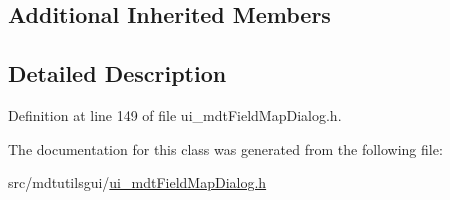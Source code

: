 \subsection*{Additional Inherited Members}


\subsection{Detailed Description}


Definition at line 149 of file ui\-\_\-mdt\-Field\-Map\-Dialog.\-h.



The documentation for this class was generated from the following file\-:\begin{DoxyCompactItemize}
\item 
src/mdtutilsgui/\hyperlink{ui__mdt_field_map_dialog_8h}{ui\-\_\-mdt\-Field\-Map\-Dialog.\-h}\end{DoxyCompactItemize}
